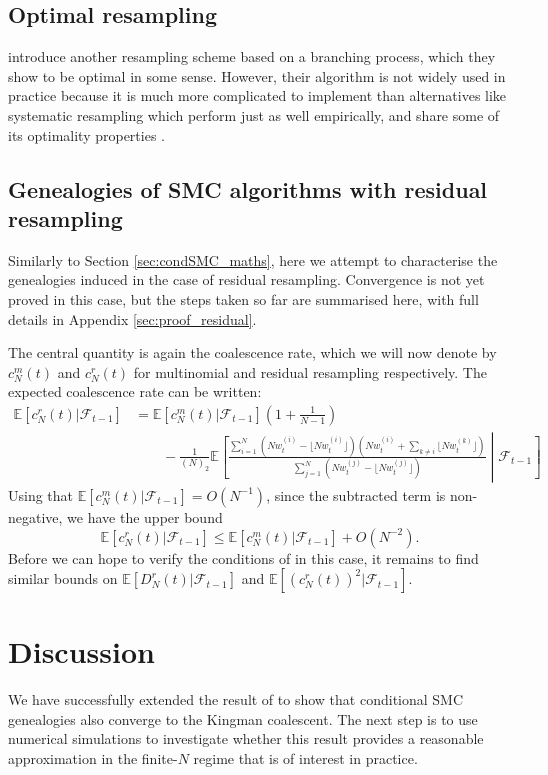 \documentclass[fleqn]{article}
\theoremstyle{definition}
\newcommand{\E}{\mathbb{E}}
\newcommand{\F}{\mathcal{F}_{t-1}}
\newcommand{\wt}[2][t]{w_{#1}^{(#2)}}
\begin{document}
\subsection{Optimal resampling}
\citet{crisan1999} introduce another resampling scheme based on a branching process, which they show to be optimal in some sense. However, their algorithm is not widely used in practice because it is much more complicated to implement than alternatives like systematic resampling which perform just as well empirically, and share some of its optimality properties \citep{bain2008}.

\subsection{Genealogies of SMC algorithms with residual resampling}
Similarly to Section \ref{sec:condSMC_maths}, here we attempt to characterise the genealogies induced in the case of residual resampling. Convergence is not yet proved in this case, but the steps taken so far are summarised here, with full details in Appendix \ref{sec:proof_residual}.

The central quantity is again the coalescence rate, which we will now denote by $c_N^m(t)$ and $c_N^r(t)$ for multinomial and residual resampling respectively.
The expected coalescence rate can be written:
\begin{align*}
\E[c^r_N(t) |\F]
&= \E[c^{m}_N(t) |\F] \left( 1 + \frac{1}{N-1} \right) \\
&\qquad- \frac{1}{(N)_2}  \E\left[ \frac{\sum_{i=1}^{N} \left(N\wt{i} - \lfloor N\wt{i} \rfloor \right) \left( N\wt{i} + \sum_{k\neq i} \lfloor N\wt{k} \rfloor \right) }{\sum_{j=1}^{N} \left(N\wt{j} - \lfloor N\wt{j}\rfloor\right)} \middle|\F \right]  
\end{align*}
Using that $\E[c^{m}_N(t) |\F] = O(N^{-1})$, since the subtracted term is non-negative, we have the upper bound
\begin{equation}\label{eq:residual_coalrate}
\E[c^r_N(t) |\F] \leq \E[c^m_N(t) |\F] + O(N^{-2}).
\end{equation}
Before we can hope to verify the conditions of \citet[Theorem 1]{koskela2018} in this case, it remains to find similar bounds on $\E[D^r_N(t) |\F]$ and $\E[(c^r_N(t))^2 |\F]$.

\section{Discussion}\label{sec:discussion}
We have successfully extended the result of \citet{koskela2018} to show that conditional SMC genealogies also converge to the Kingman coalescent. The next step is to use numerical simulations to investigate whether this result provides a reasonable approximation in the finite-$N$ regime that is of interest in practice.
\end{document}
